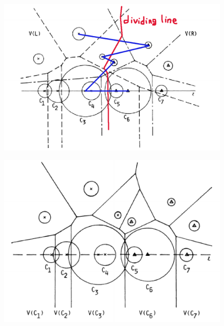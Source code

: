 \documentclass[12pt]{article}
\begin{document}
\begin{CJK}{UTF8}{bkai}
\begin{figure}[h]
\includegraphics[scale=0.4]{figure11.eps}
\caption{}
\end{figure}

\begin{figure}[h]
\includegraphics[scale=0.4]{figure12.eps}
\caption{}
\end{figure}

\end{CJK}
\end{document}
